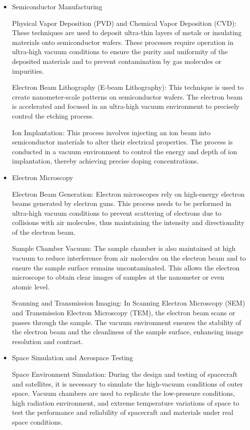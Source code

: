 \begin{itemize}
	\item Semiconductor Manufacturing
	
	Physical Vapor Deposition (PVD) and Chemical Vapor Deposition (CVD): These techniques are used to deposit ultra-thin layers of metals or insulating materials onto semiconductor wafers. These processes require operation in ultra-high vacuum conditions to ensure the purity and uniformity of the deposited materials and to prevent contamination by gas molecules or impurities.
	
	Electron Beam Lithography (E-beam Lithography): This technique is used to create nanometer-scale patterns on semiconductor wafers. The electron beam is accelerated and focused in an ultra-high vacuum environment to precisely control the etching process.
	
	Ion Implantation: This process involves injecting an ion beam into semiconductor materials to alter their electrical properties. The process is conducted in a vacuum environment to control the energy and depth of ion implantation, thereby achieving precise doping concentrations.
	
	\item Electron Microscopy
	
	Electron Beam Generation: Electron microscopes rely on high-energy electron beams generated by electron guns. This process needs to be performed in ultra-high vacuum conditions to prevent scattering of electrons due to collisions with air molecules, thus maintaining the intensity and directionality of the electron beam.
	
	Sample Chamber Vacuum: The sample chamber is also maintained at high vacuum to reduce interference from air molecules on the electron beam and to ensure the sample surface remains uncontaminated. This allows the electron microscope to obtain clear images of samples at the nanometer or even atomic level.
	
	Scanning and Transmission Imaging: In Scanning Electron Microscopy (SEM) and Transmission Electron Microscopy (TEM), the electron beam scans or passes through the sample. The vacuum environment ensures the stability of the electron beam and the cleanliness of the sample surface, enhancing image resolution and contrast.
	
	\item Space Simulation and Aerospace Testing
	
	Space Environment Simulation: During the design and testing of spacecraft and satellites, it is necessary to simulate the high-vacuum conditions of outer space. Vacuum chambers are used to replicate the low-pressure conditions, high radiation environment, and extreme temperature variations of space to test the performance and reliability of spacecraft and materials under real space conditions.
	

\end{itemize}
